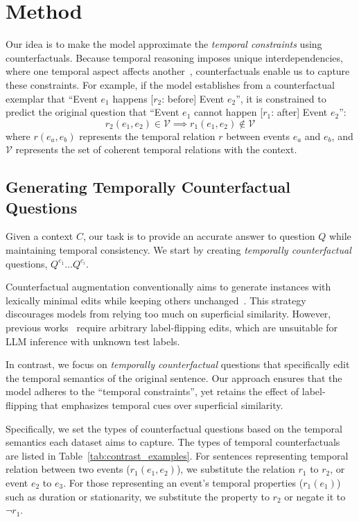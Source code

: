 

\section{Method}


Our idea is to make the model approximate the \textit{temporal constraints} using counterfactuals. 
Because temporal reasoning imposes unique interdependencies, where one temporal aspect affects another~\cite{han2019deep,kim-etal-2024-chaining}, counterfactuals enable us to capture these constraints.
For example, if the model establishes from a counterfactual exemplar that ``Event $e_1$ happens [$r_2$: before] Event $e_2$'', it is constrained to predict the original question that ``Event $e_1$ cannot happen [$r_1$: after] Event $e_2$'':
\begin{equation}
r_2(e_1, e_2) \in \mathcal{V} \implies r_1(e_1, e_2) \not\in \mathcal{V}
\end{equation}
where $r(e_a,e_b)$ represents the temporal relation $r$ between events $e_a$ and $e_b$, and $\mathcal{V}$ represents the set of coherent temporal relations with the context.


\subsection{Generating Temporally Counterfactual Questions}

Given a context $C$, our task is to provide an accurate answer to question $Q$ while maintaining temporal consistency.
We start by creating \textit{temporally counterfactual} questions, $Q^{c_1}...Q^{c_i}$.

Counterfactual augmentation conventionally aims to generate instances with lexically minimal edits
while keeping others unchanged~\cite{huang2019reducing,kaushik2020learning,wang2020identifying}. This strategy discourages models from relying too much on superficial similarity. However, previous works~\cite{kaushik2020learning} require arbitrary label-flipping edits, which are unsuitable for LLM inference with unknown test labels.

In contrast, we focus on \textit{temporally counterfactual} questions that specifically edit the temporal semantics of the original sentence.  
Our approach ensures that the model adheres to the ``temporal constraints'', yet retains the effect of label-flipping that emphasizes temporal cues over superficial similarity.


Specifically, we set the types of counterfactual questions based on the temporal semantics each dataset aims to capture.
The types of temporal counterfactuals are listed in Table~\ref{tab:contrast_examples}. 
For sentences representing temporal relation between two events ($r_1(e_1,e_2)$), we substitute the relation $r_1$ to $r_2$, or event $e_2$ to $e_3$. For those representing an event's temporal properties ($r_1(e_1)$) such as duration or stationarity, we substitute the property to $r_2$ or negate it to $\neg r_1$.


